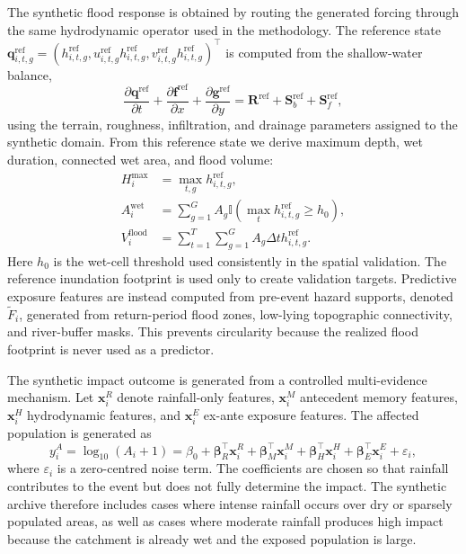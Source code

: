 \documentclass[pdflatex,sn-mathphys-ay]{sn-jnl}
\theoremstyle{thmstyleone}
\begin{document}
The synthetic flood response is obtained by routing the generated
forcing through the same hydrodynamic operator used in the methodology.
The reference state
$\mathbf{q}^{\mathrm{ref}}_{i,t,g}
=(h^{\mathrm{ref}}_{i,t,g},
u^{\mathrm{ref}}_{i,t,g}h^{\mathrm{ref}}_{i,t,g},
v^{\mathrm{ref}}_{i,t,g}h^{\mathrm{ref}}_{i,t,g})^{\top}$
is computed from the shallow-water balance,
\begin{equation}
  \frac{\partial \mathbf{q}^{\mathrm{ref}}}{\partial t}
  +
  \frac{\partial \mathbf{f}^{\mathrm{ref}}}{\partial x}
  +
  \frac{\partial \mathbf{g}^{\mathrm{ref}}}{\partial y}
  =
  \mathbf{R}^{\mathrm{ref}}
  +
  \mathbf{S}^{\mathrm{ref}}_{b}
  +
  \mathbf{S}^{\mathrm{ref}}_{f},
  \label{eq:synthetic_reference_swe}
\end{equation}
using the terrain, roughness, infiltration, and drainage parameters
assigned to the synthetic domain.  From this reference state we derive
maximum depth, wet duration, connected wet area, and flood volume:
\begin{align}
  H^{\max}_{i}
  &=
  \max_{t,g}
  h^{\mathrm{ref}}_{i,t,g},
  \label{eq:synthetic_hmax}
  \\
  A^{\mathrm{wet}}_{i}
  &=
  \sum_{g=1}^{G}
  A_g
  \mathbb{I}
  \left(
    \max_t h^{\mathrm{ref}}_{i,t,g}\geq h_0
  \right),
  \label{eq:synthetic_awet}
  \\
  V^{\mathrm{flood}}_{i}
  &=
  \sum_{t=1}^{T}
  \sum_{g=1}^{G}
  A_g\Delta t
  h^{\mathrm{ref}}_{i,t,g}.
  \label{eq:synthetic_volume}
\end{align}
Here $h_0$ is the wet-cell threshold used consistently in the spatial
validation.  The reference inundation footprint is used only to create
validation targets.  Predictive exposure features are instead computed
from pre-event hazard supports, denoted $\widetilde{F}_{i}$, generated
from return-period flood zones, low-lying topographic connectivity,
and river-buffer masks.  This prevents circularity because the realized
flood footprint is never used as a predictor.

The synthetic impact outcome is generated from a controlled
multi-evidence mechanism.  Let $\mathbf{x}^{R}_{i}$ denote
rainfall-only features, $\mathbf{x}^{M}_{i}$ antecedent memory
features, $\mathbf{x}^{H}_{i}$ hydrodynamic features, and
$\mathbf{x}^{E}_{i}$ ex-ante exposure features.  The affected
population is generated as
\begin{equation}
  y^{A}_{i}
  =
  \log_{10}
  \left(
    A_i+1
  \right)
  =
  \beta_0
  +
  \boldsymbol{\beta}^{\top}_{R}
  \mathbf{x}^{R}_{i}
  +
  \boldsymbol{\beta}^{\top}_{M}
  \mathbf{x}^{M}_{i}
  +
  \boldsymbol{\beta}^{\top}_{H}
  \mathbf{x}^{H}_{i}
  +
  \boldsymbol{\beta}^{\top}_{E}
  \mathbf{x}^{E}_{i}
  +
  \varepsilon_i,
  \label{eq:synthetic_impact}
\end{equation}
where $\varepsilon_i$ is a zero-centred noise term.  The coefficients
are chosen so that rainfall contributes to the event but does not fully
determine the impact.  The synthetic archive therefore includes cases
where intense rainfall occurs over dry or sparsely populated areas, as
well as cases where moderate rainfall produces high impact because the
catchment is already wet and the exposed population is large.
\end{document}
